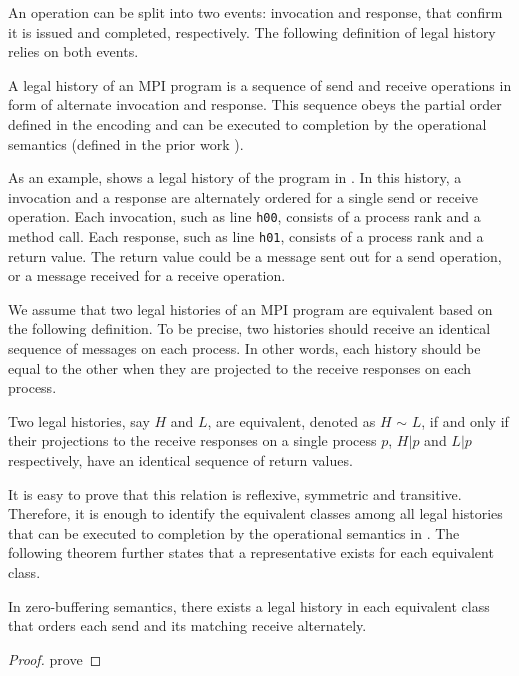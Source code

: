 An operation can be split into two events: invocation and response, that confirm it is issued and completed, respectively. The following definition of legal history relies on both events.

\begin{definition}
A legal history of an MPI program is a sequence of send and receive operations in form of alternate invocation and response. This sequence obeys the partial order defined in the encoding and can be executed to completion by the operational semantics (defined in the prior work \cite{}). 
\end{definition}

As an example,  shows a legal history of the program in . In this history, a invocation and a response are alternately ordered for a single send or receive operation. Each invocation, such as line \texttt{h00}, consists of a process rank and a method call. Each response, such as line \texttt{h01}, consists of a process rank and a return value. The return value could be a message sent out for a send operation, or a message received for a receive operation.

We assume that two legal histories of an MPI program are equivalent based on the following definition. To be precise, two histories should receive an identical sequence of messages on each process. In other words, each history should be equal to the other when they are projected to the receive responses on each process. 

\begin{definition}
Two legal histories, say $H$ and $L$, are equivalent, denoted as $H$ $\sim$ $L$, if and only if their projections to the receive responses on a single process $p$, $H | p$ and $L | p$ respectively, have an identical sequence of return values.
\end{definition}

It is easy to prove that this relation is reflexive, symmetric and transitive. Therefore, it is enough to identify the equivalent classes among all legal histories that can be executed to completion by the operational semantics in \cite{}. The following theorem further states that a representative exists for each equivalent class. 

\begin{theorem}
In zero-buffering semantics, there exists a legal history in each equivalent class that orders each send and its matching receive alternately. 
\end{theorem}

\begin{proof}
prove 
\end{proof}



 


